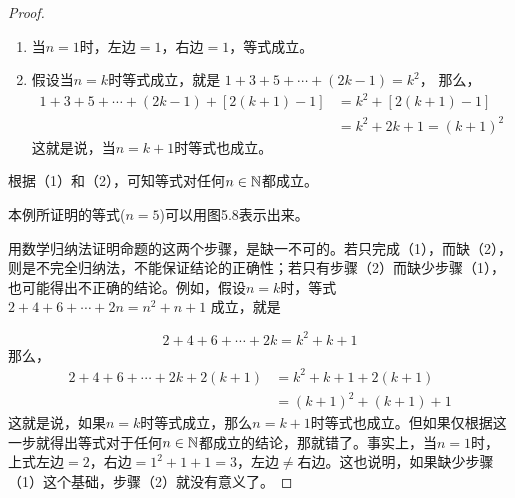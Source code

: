 \begin{proof}
\begin{enumerate}[(1)]
    \item 当$n=1$时，左边$=1$，右边$=1$，等式成立。
    \item 假设当$n=k$时等式成立，就是
   $ 1+3+5+\cdots +(2k-1)=k^2$，
    那么，
\[\begin{split}
    1+3+5+\cdots +(2k-1)+[2(k+1)-1]&=k^2 +[2(k+1)-1]\\
    &=k^2+2k+1=(k+1)^2
\end{split}\]
这就是说，当$n=k+1$时等式也成立。
\end{enumerate}

\noindent
\begin{minipage}{.5\textwidth}
    \CTEXindent
    根据（1）和（2），可知等式对任何$n\in\mathbb{N}$都成立。

本例所证明的等式($n=5$)可以用图5.8表示出来。

用数学归纳法证明命题的这两个步骤，是缺一不可的。若只完成（1），而缺（2），则是不完全归纳法，不能保证结论的正确性；若只有步骤（2）而缺少步骤（1），也可能得出不正确的结论。例如，假设$n=k$时，等式
$2+4+6+\cdots +2n=n^2+n+1$
成立，就是
\end{minipage}\hfill
\begin{minipage}{.45\textwidth}
\centering
{}
\end{minipage}

\[2+4+6+\cdots +2k=k^2+k+1\]
那么，
\[\begin{split}
  2+4+6+\cdots+2k+2(k+1)&=k^2+k+1+2(k+1)\\
&=(k+1)^2+(k+1)+1
\end{split}\]
这就是说，如果$n=k$时等式成立，那么$n=k+1$时等式也成立。但如果仅根据这一步就得出等式对于任何$n\in\mathbb{N}$都成立的结论，那就错了。事实上，当$n=1$时，上式左边$=2$，右边$=1^2+1+1=3$，左边$\ne $右边。这也说明，如果缺少步骤（1）这个基础，步骤（2）就没有意义了。
\end{proof}

